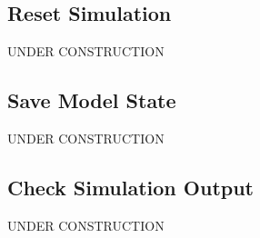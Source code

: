 \documentclass[12pt]{article}
\begin{document}
\subsection*{Reset Simulation}

UNDER CONSTRUCTION

\subsection*{Save Model State}

UNDER CONSTRUCTION

\subsection*{Check Simulation Output}

UNDER CONSTRUCTION
\end{document}
